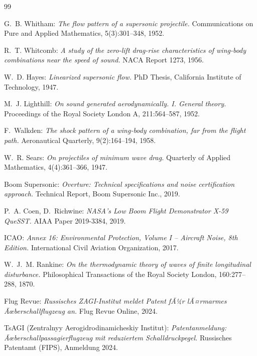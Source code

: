 ﻿\documentclass[12pt,a4paper]{article}
\theoremstyle{definition}
\theoremstyle{remark}
\begin{document}
\begin{thebibliography}{99}

G.~B. Whitham:
\textit{The flow pattern of a supersonic projectile.}
Communications on Pure and Applied Mathematics, 5(3):301--348, 1952.

R.~T. Whitcomb:
\textit{A study of the zero-lift drag-rise characteristics of wing-body combinations near the speed of sound.}
NACA Report 1273, 1956.

W.~D. Hayes:
\textit{Linearized supersonic flow.}
PhD Thesis, California Institute of Technology, 1947.

M.~J. Lighthill:
\textit{On sound generated aerodynamically. I. General theory.}
Proceedings of the Royal Society London A, 211:564--587, 1952.

F.~Walkden:
\textit{The shock pattern of a wing-body combination, far from the flight path.}
Aeronautical Quarterly, 9(2):164--194, 1958.

W.~R. Sears:
\textit{On projectiles of minimum wave drag.}
Quarterly of Applied Mathematics, 4(4):361--366, 1947.

Boom Supersonic:
\textit{Overture: Technical specifications and noise certification approach.}
Technical Report, Boom Supersonic Inc., 2019.

P.~A. Coen, D.~Richwine:
\textit{NASA's Low Boom Flight Demonstrator X-59 QueSST.}
AIAA Paper 2019-3384, 2019.

ICAO:
\textit{Annex 16: Environmental Protection, Volume I -- Aircraft Noise, 8th Edition.}
International Civil Aviation Organization, 2017.

W.~J.~M. Rankine:
\textit{On the thermodynamic theory of waves of finite longitudinal disturbance.}
Philosophical Transactions of the Royal Society London, 160:277--288, 1870.

Flug Revue:
\textit{Russisches ZAGI-Institut meldet Patent fÃ¼r lÃ¤rmarmes Ãœberschallflugzeug an.}
Flug Revue Online, 2024.

TsAGI (Zentralnyy Aerogidrodinamicheskiy Institut):
\textit{Patentanmeldung: Ãœberschallpassagierflugzeug mit reduziertem Schalldruckpegel.}
Russisches Patentamt (FIPS), Anmeldung 2024.

\end{thebibliography}
\end{document}
